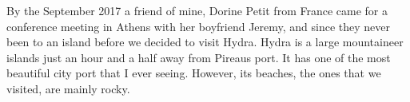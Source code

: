 \documentclass[10pt,a4paper]{article} %
\begin{document}
\begin{multicols}{3}
By the September 2017 a friend of mine, Dorine Petit from France came for a 
conference meeting in Athens with her boyfriend Jeremy, and since they 
never been to an island before we decided to visit Hydra. 
Hydra is a large mountaineer islands just an hour and a half away from Pireaus 
port. 
It has one of the most beautiful city port that I ever seeing. 
However, its beaches, the ones that we visited, are mainly rocky.  


\end{multicols}

\end{document}
